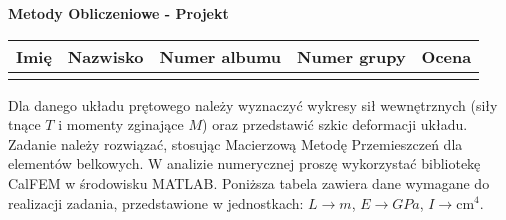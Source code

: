 \documentclass[a4paper,10pt]{article}
\begin{document}
\begin{center}
    {\Large \textbf{Metody Obliczeniowe - Projekt}}
\end{center}

\begin{table}[ht]
    \centering
    \begin{tabular}{
        m{}m{}m{}m{}m{}}
    \toprule
    Imię & Nazwisko & Numer albumu & Numer grupy  & Ocena \\ \midrule
         &          &              &              &       \\ \bottomrule
    \end{tabular}
    \label{tab:dane_studenta}
\end{table}

Dla danego układu prętowego należy wyznaczyć wykresy sił wewnętrznych (siły tnące \(T\) i momenty zginające \(M\))
oraz przedstawić szkic deformacji układu. Zadanie należy rozwiązać, stosując Macierzową Metodę Przemieszczeń
dla elementów belkowych. W analizie numerycznej proszę wykorzystać bibliotekę CalFEM w środowisku MATLAB.
Poniższa tabela zawiera dane wymagane do realizacji zadania, przedstawione w jednostkach:
\(L \rightarrow \si{m}\), \(E \rightarrow \si{GPa}\), \(I \rightarrow \si{\centi\meter^4}\).

\end{document}
